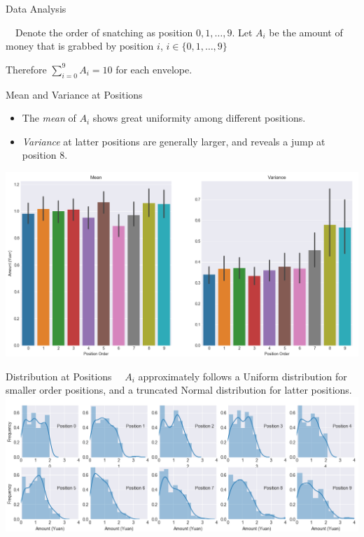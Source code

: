 \documentclass[12pt]{beamer}
\renewcommand{\[}{\begin{equation*} \begin{aligned}} %
\renewcommand{\]}{\end{aligned} \end{equation*}}
\begin{document}
\begin{frame}{Data Analysis}
	\begin{definition}
		\ \ Denote the order of snatching as position $0, 1, \dots , 9$. Let $A_i$ be the amount of money that is grabbed by position $i$, $i \in \{0, 1, \dots , 9\}$
	\end{definition}
	\vspace{6pt}
	Therefore $\sum_{i=0}^9 A_i = 10$ for each envelope.
\end{frame}

\begin{frame}{Mean and Variance at Positions}
	\begin{itemize}
		\item The \textit{mean} of $A_i$ shows great uniformity among different positions.
		\item \textit{Variance} at latter positions are generally larger, and reveals a jump at position $8$.
	\end{itemize}
	\centering
	\includegraphics[scale=0.3]{data1.png}
\end{frame}

\begin{frame}{Distribution at Positions}
	\ \ $A_i$ approximately follows a Uniform distribution for smaller order positions, and a truncated Normal distribution for latter positions.
	\vspace{16pt}
	\centering
	\includegraphics[scale=0.4]{data2.png}
\end{frame}
\end{document}
